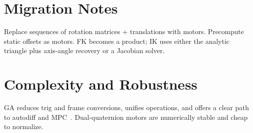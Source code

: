 \documentclass[11pt]{article}
\begin{document}
\section{Migration Notes}
Replace sequences of rotation matrices + translations with motors.
Precompute static offsets as motors. FK becomes a product; IK uses either the analytic triangle plus axis-angle recovery or a Jacobian solver.

\section{Complexity and Robustness}
GA reduces trig and frame conversions, unifies operations, and offers a clear path to autodiff and MPC~\cite{lasenby2024ga}. Dual-quaternion motors are numerically stable and cheap to normalize.



\end{document}
